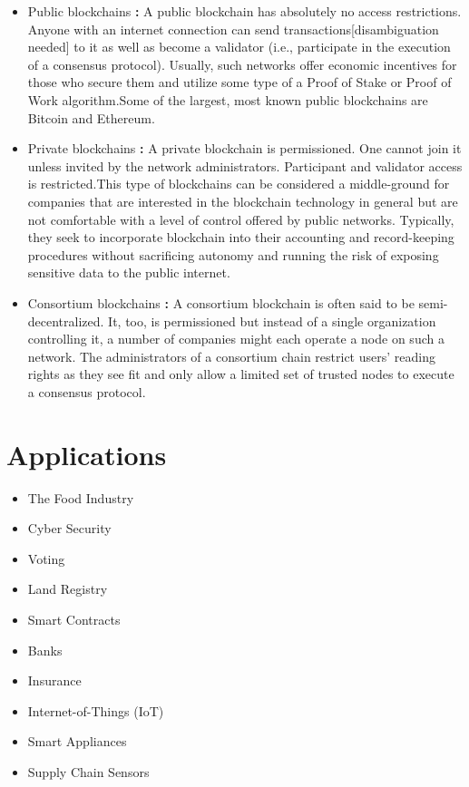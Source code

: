 \begin{itemize}
    \item {Public blockchains}\textbf{ : }A public blockchain has absolutely no access restrictions. Anyone with an internet connection can send transactions[disambiguation needed] to it as well as become a validator (i.e., participate in the execution of a consensus protocol). Usually, such networks offer economic incentives for those who secure them and utilize some type of a Proof of Stake or Proof of Work algorithm.Some of the largest, most known public blockchains are Bitcoin and Ethereum.
    
    \item {Private blockchains}\textbf{ : }A private blockchain is permissioned. One cannot join it unless invited by the network administrators. Participant and validator access is restricted.This type of blockchains can be considered a middle-ground for companies that are interested in the blockchain technology in general but are not comfortable with a level of control offered by public networks. Typically, they seek to incorporate blockchain into their accounting and record-keeping procedures without sacrificing autonomy and running the risk of exposing sensitive data to the public internet.
    
    \item {Consortium blockchains}\textbf{ : }A consortium blockchain is often said to be semi-decentralized. It, too, is permissioned but instead of a single organization controlling it, a number of companies might each operate a node on such a network. The administrators of a consortium chain restrict users’ reading rights as they see fit and only allow a limited set of trusted nodes to execute a consensus protocol.

\end{itemize}

\section{Applications}

\begin{itemize}
    \item The Food Industry
    \item Cyber Security
    \item Voting
    \item Land Registry
    \item Smart Contracts
    \item Banks
    \item Insurance
    \item Internet-of-Things (IoT)
    \item Smart Appliances
    \item Supply Chain Sensors
\end{itemize}



